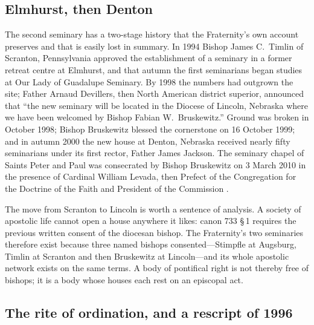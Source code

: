 \subsection{Elmhurst, then Denton}

The second seminary has a two-stage history that the Fraternity's own
account preserves and that is easily lost in summary. In 1994 Bishop
James C.\ Timlin of Scranton, Pennsylvania approved the establishment of
a seminary in a former retreat centre at Elmhurst, and that autumn the
first seminarians began studies at Our Lady of Guadalupe Seminary. By
1998 the numbers had outgrown the site; Father Arnaud Devillers, then
North American district superior, announced that ``the new seminary will
be located in the Diocese of Lincoln, Nebraska where we have been
welcomed by Bishop Fabian W.\ Bruskewitz.'' Ground was broken in October
1998; Bishop Bruskewitz blessed the cornerstone on 16 October 1999; and
in autumn 2000 the new house at Denton, Nebraska received nearly fifty
seminarians under its first rector, Father James Jackson. The seminary
chapel of Saints Peter and Paul was consecrated by Bishop Bruskewitz on 3
March 2010 in the presence of Cardinal William Levada, then Prefect of the
Congregation for the Doctrine of the Faith and President of the
Commission .

The move from Scranton to Lincoln is worth a sentence of analysis. A
society of apostolic life cannot open a house anywhere it likes: canon
733 §\,1 requires the previous written consent of the diocesan bishop.
The Fraternity's two seminaries therefore exist because three named
bishops consented---Stimpfle at Augsburg, Timlin at Scranton and then
Bruskewitz at Lincoln---and its whole apostolic network exists on the
same terms. A
body of pontifical right is not thereby free of bishops; it is a body
whose houses each rest on an episcopal act.

\subsection{The rite of ordination, and a rescript of 1996}

